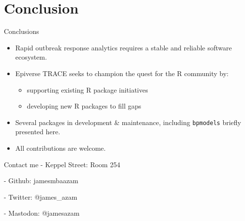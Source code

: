 \documentclass[10pt]{beamer}
\begin{document}
\section{Conclusion}
\begin{frame}[fragile]{Conclusions}
\begin{itemize}
	\item Rapid outbreak response analytics requires a stable and reliable software ecosystem.
	\item Epiverse TRACE seeks to champion the quest for the R community by:
	\begin{itemize}
		\item supporting existing R package initiatives
		\item developing new R packages to fill gaps
	\end{itemize}
\item Several packages in development \& maintenance, including \texttt{bpmodels} briefly presented here.
\item All contributions are welcome. 
\end{itemize}
\end{frame}
\begin{frame}[fragile]{Contact me}
	- Keppel Street: Room 254 
	
	- Github: jamesmbaazam
	
	- Twitter: @james\_azam
	
	- Mastodon: @jamesazam
\end{frame}
\end{document}
